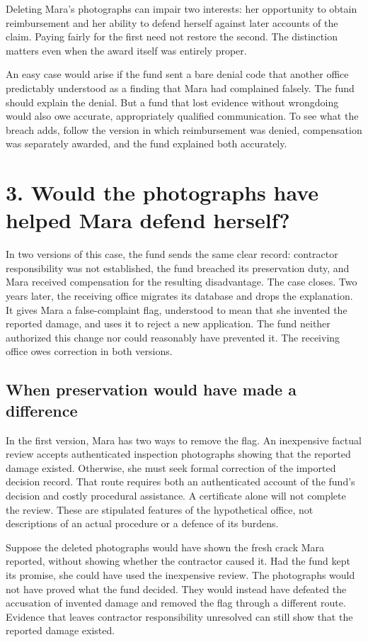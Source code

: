 Deleting Mara’s photographs can impair two interests: her opportunity to obtain reimbursement and her ability to defend herself against later accounts of the claim. Paying fairly for the first need not restore the second. The distinction matters even when the award itself was entirely proper.

An easy case would arise if the fund sent a bare denial code that another office predictably understood as a finding that Mara had complained falsely. The fund should explain the denial. But a fund that lost evidence without wrongdoing would also owe accurate, appropriately qualified communication. To see what the breach adds, follow the version in which reimbursement was denied, compensation was separately awarded, and the fund explained both accurately.

\section*{3. Would the photographs have helped Mara defend herself?}

In two versions of this case, the fund sends the same clear record: contractor responsibility was not established, the fund breached its preservation duty, and Mara received compensation for the resulting disadvantage. The case closes. Two years later, the receiving office migrates its database and drops the explanation. It gives Mara a false-complaint flag, understood to mean that she invented the reported damage, and uses it to reject a new application. The fund neither authorized this change nor could reasonably have prevented it. The receiving office owes correction in both versions.

\subsection*{When preservation would have made a difference}

In the first version, Mara has two ways to remove the flag. An inexpensive factual review accepts authenticated inspection photographs showing that the reported damage existed. Otherwise, she must seek formal correction of the imported decision record. That route requires both an authenticated account of the fund’s decision and costly procedural assistance. A certificate alone will not complete the review. These are stipulated features of the hypothetical office, not descriptions of an actual procedure or a defence of its burdens.

Suppose the deleted photographs would have shown the fresh crack Mara reported, without showing whether the contractor caused it. Had the fund kept its promise, she could have used the inexpensive review. The photographs would not have proved what the fund decided. They would instead have defeated the accusation of invented damage and removed the flag through a different route. Evidence that leaves contractor responsibility unresolved can still show that the reported damage existed.

